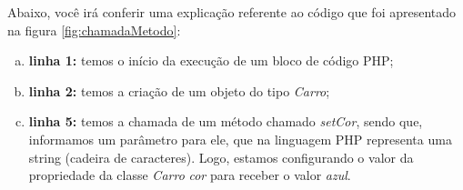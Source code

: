 \FloatBarrier 	%

Abaixo, você irá conferir uma explicação referente ao código que foi
apresentado na figura \ref{fig:chamadaMetodo}:

\begin{enumerate}[a)]
    \item \textbf{linha 1:} temos o início da execução de um bloco de código
    PHP;
    \item \textbf{linha 2:} temos a criação de um objeto do tipo \textit{Carro};
    \item \textbf{linha 5:} temos a chamada de um método chamado
    \textit{setCor}, sendo que, informamos um parâmetro para ele, que na 
    linguagem PHP representa uma string (cadeira de caracteres). Logo, estamos 
    configurando o valor da propriedade da classe \textit{Carro} \textit{cor}
    para receber o valor \textit{azul}.
\end{enumerate}